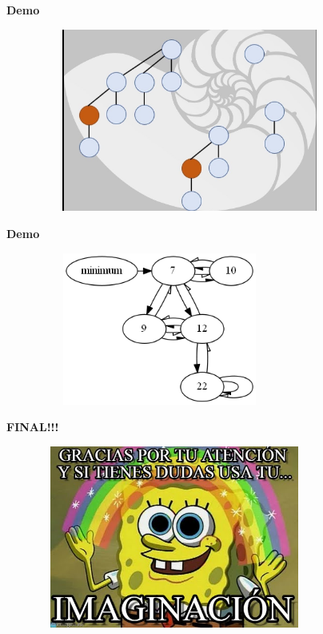 \documentclass[11pt]{beamer}
\begin{document}
\begin{frame}{\bf \large {}}

{\center \bf \Large \color{red} Demo \\}
\begin{figure}[center]

  \includegraphics[width=10cm, height=6cm]{Img/Demo.jpg}
  
\end{figure}
\end{frame}

\begin{frame}{\bf \large {}}

{\center \bf \Large \color{red} Demo \\}
\begin{figure}[center]

  \includegraphics[width=8cm, height=5cm]{Img/Demo.png}
  
\end{figure}
\end{frame}

\begin{frame}{\bf \large {}}

{\center \bf \Huge \color{purple} FINAL!!! \\}
\begin{figure}[center]

  \includegraphics[width=9cm, height=6cm]{Img/Gracias.jpg}
  
\end{figure}
\end{frame}
\end{document}
